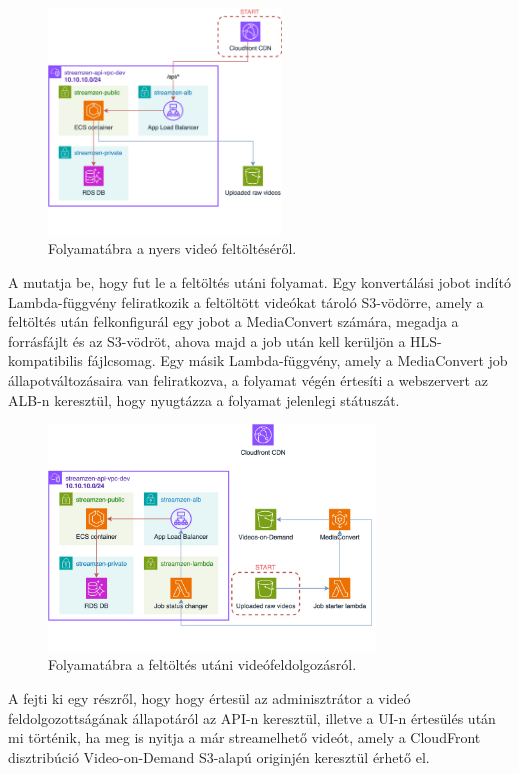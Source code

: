 \begin{figure}[ht]
	\centering
	\includegraphics[height=60mm, keepaspectratio]{figures/dipterv_vod1.png}
	\caption{Folyamatábra a nyers videó feltöltéséről.}
	\label{fig:vod1}
\end{figure}

A  mutatja be, hogy fut le a feltöltés utáni folyamat. Egy konvertálási jobot indító Lambda-függvény feliratkozik a feltöltött videókat tároló S3-vödörre, amely a feltöltés után felkonfigurál egy jobot a MediaConvert számára, megadja a forrásfájlt és az S3-vödröt, ahova majd a job után kell kerüljön a HLS-kompatibilis fájlcsomag. Egy másik Lambda-függvény, amely a MediaConvert job állapotváltozásaira van feliratkozva, a folyamat végén értesíti a webszervert az ALB-n keresztül, hogy nyugtázza a folyamat jelenlegi státuszát.

\begin{figure}[!ht]
	\centering
	\includegraphics[height=60mm, keepaspectratio]{figures/dipterv_vod2.png}
	\caption{Folyamatábra a feltöltés utáni videófeldolgozásról.}
	\label{fig:vod2}
\end{figure}

A  fejti ki egy részről, hogy hogy értesül az adminisztrátor a videó feldolgozottságának állapotáról az API-n keresztül, illetve a UI-n értesülés után mi történik, ha meg is nyitja a már streamelhető videót, amely a CloudFront disztribúció Video-on-Demand S3-alapú originjén keresztül érhető el.

